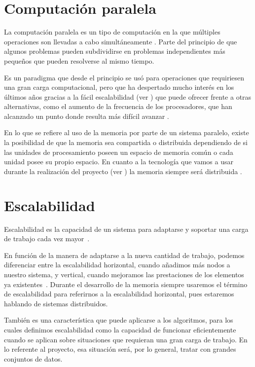 \section{Computación paralela}\label{sec:CompParalela}

La computación paralela es un tipo de computación en la que múltiples operaciones son llevadas a cabo simultáneamente \cite{Almasi:1989}. Parte del principio de que algunos problemas pueden subdividirse en problemas independientes más pequeños que pueden resolverse al mismo tiempo.

Es un paradigma que desde el principio se usó para operaciones que requiriesen una gran carga computacional, pero que ha despertado mucho interés en los últimos años gracias a la fácil escalabilidad (ver ) que puede ofrecer frente a otras alternativas, como el aumento de la frecuencia de los procesadores, que han alcanzado un punto donde resulta más difícil avanzar \cite{CompParalelaWiki}.

En lo que se refiere al uso de la memoria por parte de un sistema paralelo, existe la posibilidad de que la memoria sea compartida o distribuida dependiendo de si las unidades de procesamiento poseen un espacio de memoria común o cada unidad posee su propio espacio. En cuanto a la tecnología que vamos a usar durante la realización del proyecto (ver ) la memoria siempre será distribuida \cite{SparkPaper}.

\section{Escalabilidad}\label{sec:DefEscalabilidad}

Escalabilidad es la capacidad de un sistema para adaptarse y soportar una carga de trabajo cada vez mayor~\cite{Bondi:2000}.

En función de la manera de adaptarse a la nueva cantidad de trabajo, podemos diferenciar entre la escalabilidad horizontal, cuando añadimos más nodos a nuestro sistema, y vertical, cuando mejoramos las prestaciones de los elementos ya existentes~\cite{EscalabilidadWiki}. Durante el desarrollo de la memoria siempre usaremos el término de escalabilidad para referirnos a la escalabilidad horizontal, pues estaremos hablando de sistemas distribuidos.

También es una característica que puede aplicarse a los algoritmos, para los cuales definimos escalabilidad como la capacidad de funcionar eficientemente cuando se aplican sobre situaciones que requieran una gran carga de trabajo. En lo referente al proyecto, esa situación será, por lo general, tratar con grandes conjuntos de datos.


